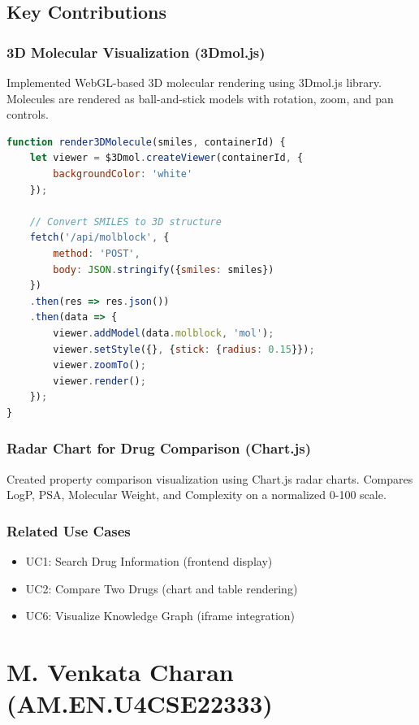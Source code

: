 \documentclass[12pt,a4paper]{report}
\begin{document}
\section{Key Contributions}

\subsection{3D Molecular Visualization (3Dmol.js)}
Implemented WebGL-based 3D molecular rendering using 3Dmol.js library. Molecules are rendered as ball-and-stick models with rotation, zoom, and pan controls.

\begin{lstlisting}[language=JavaScript, caption=3D Molecule Rendering Code]
function render3DMolecule(smiles, containerId) {
    let viewer = $3Dmol.createViewer(containerId, {
        backgroundColor: 'white'
    });
    
    // Convert SMILES to 3D structure
    fetch('/api/molblock', {
        method: 'POST',
        body: JSON.stringify({smiles: smiles})
    })
    .then(res => res.json())
    .then(data => {
        viewer.addModel(data.molblock, 'mol');
        viewer.setStyle({}, {stick: {radius: 0.15}});
        viewer.zoomTo();
        viewer.render();
    });
}
\end{lstlisting}

\subsection{Radar Chart for Drug Comparison (Chart.js)}
Created property comparison visualization using Chart.js radar charts. Compares LogP, PSA, Molecular Weight, and Complexity on a normalized 0-100 scale.

\subsection{Related Use Cases}
\begin{itemize}
    \item UC1: Search Drug Information (frontend display)
    \item UC2: Compare Two Drugs (chart and table rendering)
    \item UC6: Visualize Knowledge Graph (iframe integration)
\end{itemize}

\newpage

\chapter{M. Venkata Charan (AM.EN.U4CSE22333)}
\end{document}
